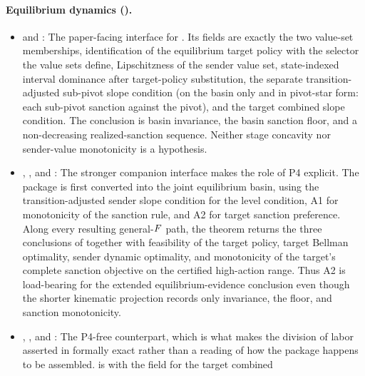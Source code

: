 \paragraph{Equilibrium dynamics ().}
\begin{itemize}[leftmargin=1.4em,itemsep=1pt]
\item {} and
: The
paper-facing interface for . Its fields are
exactly the two value-set memberships, identification of the
equilibrium target policy with the selector the value sets define, Lipschitzness
of the sender value set, state-indexed interval dominance after target-policy
substitution, the separate transition-adjusted sub-pivot slope condition (on the basin only and in pivot-star form: each sub-pivot sanction
against the pivot), and
the target combined slope condition. The conclusion is basin invariance, the
basin sanction floor, and a non-decreasing realized-sanction sequence.
Neither stage concavity nor sender-value monotonicity is a hypothesis.
\item
{},
,
and
:
The stronger companion interface makes the role of P4 explicit.
The package is first converted into the joint equilibrium basin, using
the transition-adjusted sender slope condition for the level condition, A1 for
monotonicity of the sanction rule, and A2 for target
sanction preference.  Along every resulting general-$F$ path, the
theorem returns the three conclusions of 
together with feasibility of the target policy, target Bellman
optimality, sender dynamic optimality, and monotonicity of the
target's complete sanction objective on the certified high-action
range.  Thus A2 is load-bearing for the extended equilibrium-evidence
conclusion even though the shorter kinematic projection records only
invariance, the floor, and sanction monotonicity.
\item {},
, and
:
The P4-free counterpart, which is what makes the division of labor
asserted in  formally exact rather than a reading of
how the package happens to be assembled. 
is  with the field for the target combined

\end{itemize}
